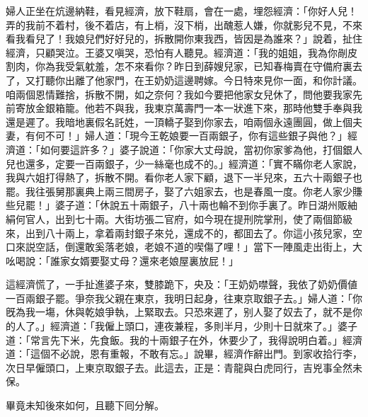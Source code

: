 婦人正坐在炕邊納鞋，看見經濟，放下鞋扇，會在一處，埋怨經濟：「你好人兒！弄的我前不着村，後不着店，有上梢，沒下梢，出醜惹人嫌，你就影兒不見，不來看我看兒了！我娘兒們好好兒的，拆散開你東我西，皆因是為誰來？」說着，扯住經濟，只顧哭泣。王婆又嗔哭，恐怕有人聽見。經濟道：「我的姐姐，我為你剮皮割肉，你為我受氣躭羞，怎不來看你？昨日到薛嫂兒家，已知春梅賣在守備府裏去了，又打聽你出離了他家門，在王奶奶這邊聘嫁。今日特來見你一面，和你計議。咱兩個恩情難捨，拆散不開，如之奈何？我如今要把他家女兒休了，問他要我家先前寄放金銀箱籠。他若不與我，我東京萬壽門一本一狀進下來，那時他雙手奉與我還是遲了。我暗地裏假名託姓，一頂轎子娶到你家去，咱兩個永遠團圓，做上個夫妻，有何不可！」婦人道：「現今王乾娘要一百兩銀子，你有這些銀子與他？」經濟道：「如何要這許多？」婆子說道：「你家大丈母說，當初你家爹為他，打個銀人兒也還多，定要一百兩銀子，少一絲毫也成不的。」經濟道：「實不瞞你老人家說，我與六姐打得熱了，拆散不開。看你老人家下顧，退下一半兒來，五六十兩銀子也罷。我往張舅那裏典上兩三間房子，娶了六姐家去，也是春風一度。你老人家少賺些兒罷！」婆子道：「休說五十兩銀子，八十兩也輪不到你手裏了。昨日湖州販紬絹何官人，出到七十兩。大街坊張二官府，如今現在提刑院掌刑，使了兩個節級來，出到八十兩上，拿着兩封銀子來兑，還成不的，都囬去了。你這小孩兒家，空口來説空話，倒還敢奚落老娘，老娘不道的喫傷了哩！」當下一陣風走出街上，大吆喝說：「誰家女婿要娶丈母？還來老娘屋裏放屁！」

這經濟慌了，一手扯進婆子來，雙膝跪下，央及：「王奶奶噤聲，我依了奶奶價値一百兩銀子罷。爭奈我父親在東京，我明日起身，往東京取銀子去。」婦人道：「你旣為我一塲，休與乾娘爭執，上緊取去。只恐來遲了，别人娶了奴去了，就不是你的人了。」經濟道：「我僱上頭口，連夜兼程，多則半月，少則十日就來了。」婆子道：「常言先下米，先食飯。我的十兩銀子在外，休要少了，我得說明白着。」經濟道：「這個不必說，恩有重報，不敢有忘。」說畢，經濟作辭出門。到家收拾行李，次日早僱頭口，上東京取銀子去。此這去，正是：青龍與白虎同行，吉兇事全然未保。

畢竟未知後來如何，且聽下囘分解。

